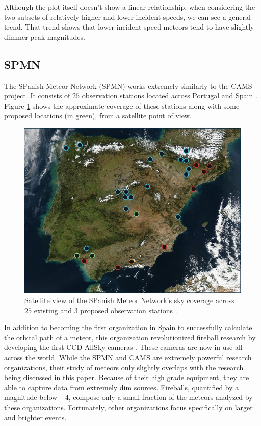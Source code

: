 Although the plot itself doesn't show a linear relationship, when considering the two subsets of relatively higher and lower incident speeds, we can see a general trend.
That trend shows that lower incident speed meteors tend to have slightly dimmer peak magnitudes. 



\subsection{SPMN}

The SPanish Meteor Network (SPMN) works extremely similarly to the CAMS project.  
It consists of $25$ observation stations located across Portugal and Spain \cite{trigo-rodriguez_2006_2007}.
Figure \ref{SPan} shows the approximate coverage of these stations along with some proposed locations (in green), from a satellite point of view.  

\begin{figure}[ht!]
  \centering
  \includegraphics[scale=0.3]{images/satalite_of_love.png}
  \caption{Satellite view of the SPanish Meteor Network's sky coverage across $25$ existing and $3$ proposed observation stations  \cite{Spanish}.}
  \label{SPan}
\end{figure}

In addition to becoming the first organization in Spain to successfully calculate the orbital path of a meteor, this organization revolutionized fireball research by developing the first CCD AllSky cameras \cite{Spanish}.
These cameras are now in use all across the world.
While the SPMN and CAMS are extremely powerful research organizations, their study of meteors only slightly overlaps with the research being discussed in this paper.
Because of their high grade equipment, they are able to capture data from extremely dim sources.
Fireballs, quantified by a magnitude below $-4$, compose only a small fraction of the meteors analyzed by these organizations.
Fortunately, other organizations focus specifically on larger and brighter events.

